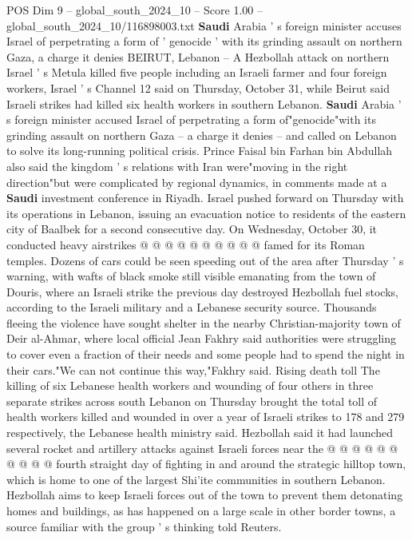\begin{textsample}{POS Dim 9 – global\_south\_2024\_10 – Score 1.00 – global\_south\_2024\_10/116898003.txt}  \label{ex:f9_pos_174}
\textbf{Saudi} Arabia ' s foreign minister accuses Israel of perpetrating a form of ' genocide ' with its grinding assault on northern Gaza, a charge it denies BEIRUT, Lebanon -- A Hezbollah attack on northern Israel ' s Metula killed five people including an Israeli farmer and four foreign workers, Israel ' s Channel 12 said on Thursday, October 31, while Beirut said Israeli strikes had killed six health workers in southern Lebanon. \textbf{Saudi} Arabia ' s foreign minister accused Israel of perpetrating a form of"genocide"with its grinding assault on northern Gaza -- a charge it denies -- and called on Lebanon to solve its long-running political crisis.
Prince Faisal bin Farhan bin Abdullah also said the kingdom ' s relations with Iran were"moving in the right direction"but were complicated by regional dynamics, in comments made at a \textbf{Saudi} investment conference in Riyadh.
Israel pushed forward on Thursday with its operations in Lebanon, issuing an evacuation notice to residents of the eastern city of Baalbek for a second consecutive day.
On Wednesday, October 30, it conducted heavy airstrikes @ @ @ @ @ @ @ @ @ @ famed for its Roman temples.
Dozens of cars could be seen speeding out of the area after Thursday ' s warning, with wafts of black smoke still visible emanating from the town of Douris, where an Israeli strike the previous day destroyed Hezbollah fuel stocks, according to the Israeli military and a Lebanese security source.
Thousands fleeing the violence have sought shelter in the nearby Christian-majority town of Deir al-Ahmar, where local official Jean Fakhry said authorities were struggling to cover even a fraction of their needs and some people had to spend the night in their cars."We can not continue this way,"Fakhry said.
Rising death toll The killing of six Lebanese health workers and wounding of four others in three separate strikes across south Lebanon on Thursday brought the total toll of health workers killed and wounded in over a year of Israeli strikes to 178 and 279 respectively, the Lebanese health ministry said.
Hezbollah said it had launched several rocket and artillery attacks against Israeli forces near the @ @ @ @ @ @ @ @ @ @ fourth straight day of fighting in and around the strategic hilltop town, which is home to one of the largest Shi'ite communities in southern Lebanon.
Hezbollah aims to keep Israeli forces out of the town to prevent them detonating homes and buildings, as has happened on a large scale in other border towns, a source familiar with the group ' s thinking told Reuters.

\end{textsample}

